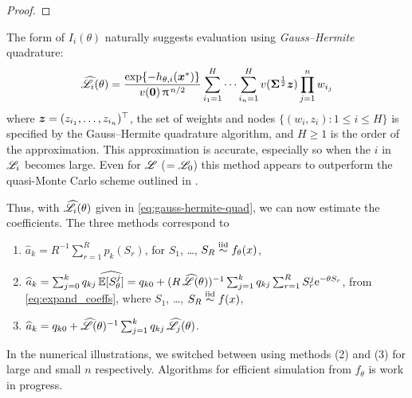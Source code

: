 \begin{subappendices}
\begin{proof}
\end{proof}


\begin{remark}
The form of $I_i(\theta)$ naturally suggests evaluation using \emph{Gauss--Hermite} quadrature:
\begin{equation} \label{eq:gauss-hermite-quad}
	\widehat{\mathscr{L}}_i(\theta) = \frac{\exp\{-h_{\theta,i}(\bm{x}^*)\}}{v(\bm{0}) \,\uppi^{\,n/2}} \sum_{i_1=1}^H \cdots \sum_{i_n=1}^H v(\bm{\Sigma}^{\frac12} \bm{z})  \prod_{j=1}^n w_{i_j}
\end{equation}
where $\bm{z} = (z_{i_1}, \dots, z_{i_n})^\top$, the set of weights and nodes $\{(w_i, z_i) : 1 \le i \le H\}$ is specified by the Gauss--Hermite quadrature algorithm, and $H \ge 1$ is the order of the approximation. This approximation is accurate, especially so when the $i$ in $\mathscr{L}_i$ becomes large. Even for $\mathscr{L}$ ($= \mathscr{L}_0$) this method appears to outperform the quasi-Monte Carlo scheme outlined in \cite{La15}. \remQED
\end{remark}



Thus, with $\widehat{\mathscr{L}}_i(\theta)$ given in \eqref{eq:gauss-hermite-quad}, we can now estimate the coefficients. The three methods correspond to
\begin{enumerate}
\item $\widehat{a}_k = R^{-1} \sum_{r=1}^R p_k(S_r)$, for $S_1$, \dots, $S_R \overset{\smash{\mathrm{iid}}}{\sim} f_\theta(x)$,
\item $\widehat{a}_k = \sum_{j=0}^k q_{kj} \, \widehat{\operatorname{{\mathbb E}}[S_\theta^j]} = q_{k0} + (R \, \widehat{\mathscr{L}}(\theta))^{-1} \sum_{j=1}^k q_{kj} \sum_{r=1}^R S_r^j \mathrm{e}^{-\theta S_r}$, from \eqref{eq:expand_coeffs}, where $S_1$, \dots, $S_R \overset{\smash{\mathrm{iid}}}{\sim} f(x)$,
\item $\widehat{a}_k = q_{k0} + \widehat{\mathscr{L}}(\theta)^{-1} \sum_{j=1}^k q_{kj} \, \widehat{\mathscr{L}}_j(\theta)$.
\end{enumerate}
In the numerical illustrations, we switched between using methods (2) and (3) for large and small $n$ respectively. Algorithms for efficient simulation from $f_\theta$ is work in progress.


\end{subappendices}